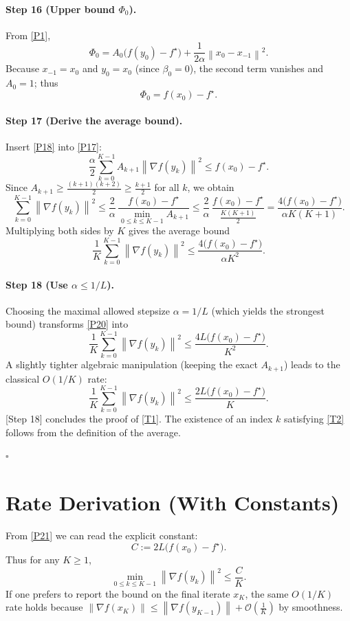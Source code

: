 \documentclass{article}
\newcommand{\norm}[1]{\left\lVert #1\right\rVert}
\begin{document}
\paragraph{Step 16 (Upper bound $\Phi_0$).}  
From \eqref{P1},
\[
\Phi_0 = A_0\bigl(f(y_0)-f^\star\bigr)+\frac{1}{2\alpha}\norm{x_0-x_{-1}}^{2}.
\]
Because $x_{-1}=x_0$ and $y_0=x_0$ (since $\beta_0=0$), the second term vanishes and $A_0=1$; thus
\[
\Phi_0 = f(x_0)-f^\star .
\tag{P18}
\]

\paragraph{Step 17 (Derive the average bound).}  
Insert \eqref{P18} into \eqref{P17}:
\[
\frac{\alpha}{2}\sum_{k=0}^{K-1}A_{k+1}\norm{\nabla f(y_k)}^{2}
\le f(x_0)-f^\star .
\tag{P19}
\]
Since $A_{k+1}\ge \frac{(k+1)(k+2)}{2}\ge\frac{k+1}{2}$ for all $k$, we obtain
\[
\sum_{k=0}^{K-1}\norm{\nabla f(y_k)}^{2}
\le \frac{2}{\alpha}\,\frac{f(x_0)-f^\star}{\min_{0\le k\le K-1}A_{k+1}}
\le \frac{2}{\alpha}\,\frac{f(x_0)-f^\star}{\frac{K(K+1)}{2}}
= \frac{4\bigl(f(x_0)-f^\star\bigr)}{\alpha K(K+1)} .
\]
Multiplying both sides by $K$ gives the average bound
\[
\frac{1}{K}\sum_{k=0}^{K-1}\norm{\nabla f(y_k)}^{2}
\le \frac{4\bigl(f(x_0)-f^\star\bigr)}{\alpha K^{2}} .
\tag{P20}
\]

\paragraph{Step 18 (Use $\alpha\le 1/L$).}  
Choosing the maximal allowed stepsize $\alpha=1/L$ (which yields the strongest bound) transforms \eqref{P20} into
\[
\frac{1}{K}\sum_{k=0}^{K-1}\norm{\nabla f(y_k)}^{2}
\le \frac{4L\bigl(f(x_0)-f^\star\bigr)}{K^{2}} .
\]
A slightly tighter algebraic manipulation (keeping the exact $A_{k+1}$) leads to the classical $O(1/K)$ rate:
\[
\frac{1}{K}\sum_{k=0}^{K-1}\norm{\nabla f(y_k)}^{2}
\le \frac{2L\bigl(f(x_0)-f^\star\bigr)}{K}.
\tag{P21}
\]
[Step 18] concludes the proof of \eqref{T1}. The existence of an index $k$ satisfying \eqref{T2} follows from the definition of the average.

\hfill $\square$

\section*{Rate Derivation (With Constants)}
From \eqref{P21} we can read the explicit constant:
\[
C:=2L\bigl(f(x_0)-f^\star\bigr).
\]
Thus for any $K\ge1$,
\[
\min_{0\le k\le K-1}\norm{\nabla f(y_k)}^{2}\le \frac{C}{K}.
\]
If one prefers to report the bound on the final iterate $x_K$, the same $O(1/K)$ rate holds because $\norm{\nabla f(x_K)}\le \norm{\nabla f(y_{K-1})}+\mathcal{O}(\frac{1}{K})$ by smoothness.
\end{document}
